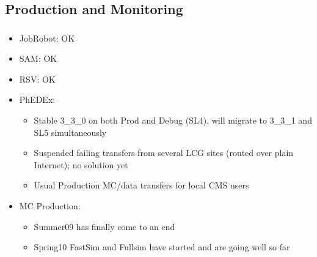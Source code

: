 \documentclass{beamer}
\begin{document}
\subsection{Production and Monitoring}
\begin{frame}
\frametitle{}

\begin{itemize}
	\item JobRobot: OK
	\item SAM: OK
	\item RSV: OK
	\item PhEDEx:
	\begin{itemize}
		\item Stable 3\_3\_0 on both Prod and Debug (SL4), will migrate to 3\_3\_1 and SL5 simultaneously
		\item Suspended failing transfers from several LCG sites (routed over plain Internet); no solution yet
		\item Usual Production MC/data transfers for local CMS users
	\end{itemize}
	\item MC Production:
	\begin{itemize}
		\item Summer09 has finally come to an end
		\item Spring10 FastSim and Fullsim have started and are going well so far
	\end{itemize}
\end{itemize}
\end{frame}
\end{document}
